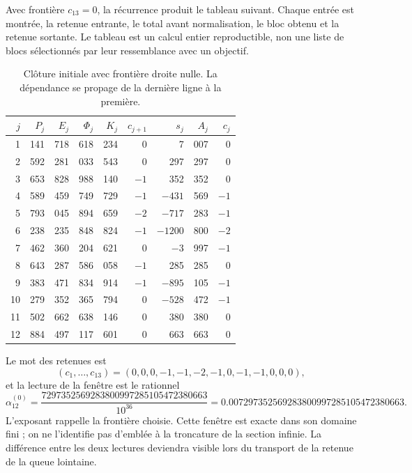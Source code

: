 Avec frontière \(c_{13}=0\), la récurrence produit le tableau suivant.
Chaque entrée est montrée, la retenue entrante, le total avant normalisation,
le bloc obtenu et la retenue sortante. Le tableau est un calcul entier
reproductible, non une liste de blocs sélectionnés par leur ressemblance avec
un objectif.

\begin{table}[htbp]
\centering
\small
\setlength{\tabcolsep}{3.5pt}
\begin{tabular}{r|rrrr|rr|rr}
\hline
\(j\)&\(P_j\)&\(E_j\)&\(\Phi_j\)&\(K_j\)&\(c_{j+1}\)&\(s_j\)&\(A_j\)&\(c_j\)\\
\hline
1&141&718&618&234&0&7&007&0\\
2&592&281&033&543&0&297&297&0\\
3&653&828&988&140&\(-1\)&352&352&0\\
4&589&459&749&729&\(-1\)&\(-431\)&569&\(-1\)\\
5&793&045&894&659&\(-2\)&\(-717\)&283&\(-1\)\\
6&238&235&848&824&\(-1\)&\(-1200\)&800&\(-2\)\\
7&462&360&204&621&0&\(-3\)&997&\(-1\)\\
8&643&287&586&058&\(-1\)&285&285&0\\
9&383&471&834&914&\(-1\)&\(-895\)&105&\(-1\)\\
10&279&352&365&794&0&\(-528\)&472&\(-1\)\\
11&502&662&638&146&0&380&380&0\\
12&884&497&117&601&0&663&663&0\\
\hline
\end{tabular}
\caption{Clôture initiale avec frontière droite nulle. La dépendance se propage de la dernière ligne à la première.}
\label{x_reciprocidad:tab:alpha-ventana}
\end{table}

Le mot des retenues est
\[
 (c_1,\ldots,c_{13})=(0,0,0,-1,-1,-2,-1,0,-1,-1,0,0,0),
\]
et la lecture de la fenêtre est le rationnel
\begin{equation}
 \alpha_{12}^{(0)}
 =\frac{7297352569283800997285105472380663}{10^{36}}
 =0.007297352569283800997285105472380663.
 \label{x_reciprocidad:eq:alpha-ventana-cero}
\end{equation}
L'exposant rappelle la frontière choisie. Cette fenêtre est exacte dans son
domaine fini ; on ne l'identifie pas d'emblée à la troncature de la
section infinie. La différence entre les deux lectures deviendra visible lors du
transport de la retenue de la queue lointaine.

